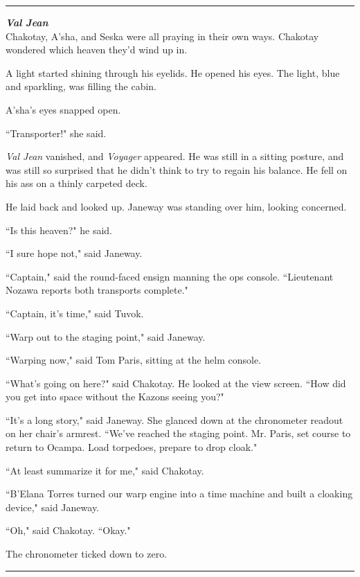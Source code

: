 \documentclass[twoside,letterpaper,12pt]{memoir}
\begin{document}
\begin{center}\rule{3cm}{0.4 pt}\end{center} 

\noindent\textit{\textbf{Val Jean}}\\

Chakotay, A'sha, and Seska were all praying in their own ways. Chakotay wondered which heaven they'd wind up in. 

A light started shining through his eyelids. He opened his eyes. The light, blue and sparkling, was filling the cabin. 

A'sha's eyes snapped open. 

``Transporter!" she said. 

\textit{Val Jean} vanished, and \textit{Voyager} appeared. He was still in a sitting posture, and was still so surprised that he didn't think to try to regain his balance. He fell on his ass on a thinly carpeted deck. 

He laid back and looked up. Janeway was standing over him, looking concerned. 

``Is this heaven?" he said. 

``I sure hope not," said Janeway. 

``Captain," said the round-faced ensign manning the ops console. ``Lieutenant Nozawa reports both transports complete." 

``Captain, it's time," said Tuvok. 

``Warp out to the staging point," said Janeway. 

``Warping now," said Tom Paris, sitting at the helm console. 

``What's going on here?" said Chakotay. He looked at the view screen. ``How did you get into space without the Kazons seeing you?" 

``It's a long story," said Janeway. She glanced down at the chronometer readout on her chair's armrest. ``We've reached the staging point. Mr. Paris, set course to return to Ocampa. Load torpedoes, prepare to drop cloak." 

``At least summarize it for me," said Chakotay. 

``B'Elana Torres turned our warp engine into a time machine and built a cloaking device," said Janeway. 

``Oh," said Chakotay. ``Okay."

The chronometer ticked down to zero. 

\begin{center}\rule{3cm}{0.4 pt}\end{center} 
\end{document}
